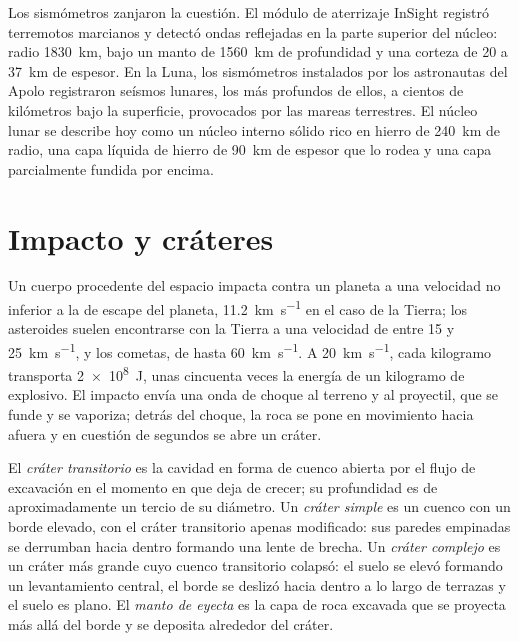 Los sismómetros zanjaron la cuestión. El módulo de aterrizaje InSight registró
terremotos marcianos y detectó ondas reflejadas en la parte superior del núcleo: radio
\qty{1830}{km}, bajo un manto de \qty{1560}{km} de profundidad y una corteza de 20 a
\qty{37}{km} de espesor. En la Luna, los sismómetros instalados por los astronautas
del Apolo registraron seísmos lunares, los más profundos de ellos, a cientos de
kilómetros bajo la superficie, provocados por las mareas terrestres. El núcleo lunar
se describe hoy como un núcleo interno sólido rico en hierro de \qty{240}{km} de radio,
una capa líquida de hierro de \qty{90}{km} de espesor que lo rodea y una
capa parcialmente fundida por encima.

\section{Impacto y cráteres}\label{sec:b3:planetary-interiors-surfaces:impacts}

Un cuerpo procedente del espacio impacta contra un planeta a una velocidad no inferior
a la de escape del planeta, \qty{11.2}{km.s^{-1}} en el caso de la Tierra; los asteroides
suelen encontrarse con la Tierra a una velocidad de entre 15 y \qty{25}{km.s^{-1}}, y los
cometas, de hasta \qty{60}{km.s^{-1}}. A \qty{20}{km.s^{-1}}, cada kilogramo transporta
\qty{2e8}{J}, unas cincuenta veces la energía de un kilogramo de explosivo. El
impacto envía una onda de choque al terreno y al proyectil, que
se funde y se vaporiza; detrás del choque, la roca se pone en movimiento hacia afuera y
en cuestión de segundos se abre un cráter.

\begin{definition}\label{def:b3:planetary-interiors-surfaces:crater-morphology}
El \emph{cráter transitorio} es la cavidad en forma de cuenco
abierta por el flujo de excavación en el momento en que deja de crecer; su
profundidad es de aproximadamente un tercio de su diámetro. Un \emph{cráter
simple} es un cuenco con un borde elevado, con el cráter
transitorio apenas modificado: sus paredes empinadas se derrumban hacia dentro formando
una lente de brecha. Un \emph{cráter complejo} es un cráter
más grande cuyo cuenco transitorio colapsó: el suelo se elevó formando un levantamiento
central, el borde se deslizó hacia dentro a lo largo de terrazas y el suelo es plano. El \emph{manto de
eyecta} es la capa de roca excavada que se
proyecta más allá del borde y se deposita alrededor del cráter.
\end{definition}

